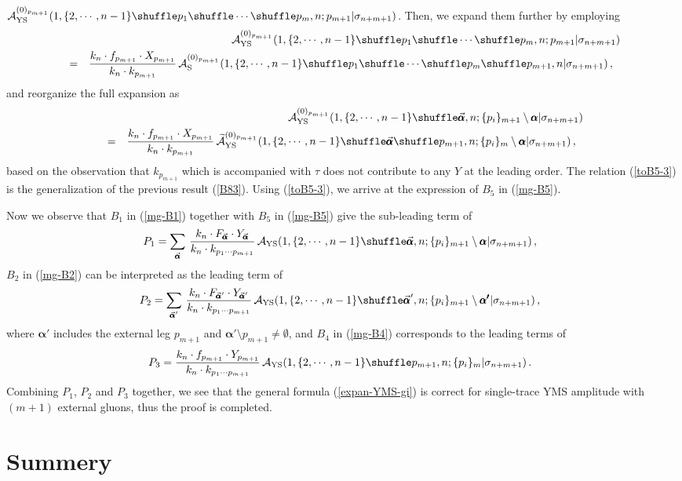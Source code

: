 \documentclass[preprint,showpacs,onecolumn,nofootinbib]{revtex4}
\newcommand{\bea}{\begin{eqnarray}}
\newcommand{\eea}{\end{eqnarray}}
\newcommand{\nn}{\nonumber \\}
\def\W #1{\widetilde{#1}}
\def\eref#1{(\ref{#1})}
\def\a{{\alpha}}
\begin{document}
${\cal A}^{(0)_{p_{m+1}}}_{\rm YS}(1,\{2,\cdots,n-1\}\shuffle p_1\shuffle\cdots\shuffle p_m,n;p_{m+1}|\sigma_{n+m+1})$. Then, we expand them further by employing
%
\bea
& &{\cal A}^{(0)_{p_{m+1}}}_{\rm YS}(1,\{2,\cdots,n-1\}\shuffle p_1\shuffle\cdots\shuffle p_m,n;p_{m+1}|\sigma_{n+m+1})\nn
&=&{k_n\cdot f_{p_{m+1}}\cdot X_{p_{m+1}}\over k_n\cdot k_{p_{m+1}}}\,{\cal A}^{(0)_{p_{m+1}}}_{\rm S}(1,\{2,\cdots,n-1\}\shuffle p_1\shuffle\cdots\shuffle p_m\shuffle p_{m+1},n|\sigma_{n+m+1})\,,~~\label{toB5-2}
\eea
%
and reorganize the full expansion as
%
\bea
& &{\cal A}^{(0)_{p_{m+1}}}_{\rm YS}(1,\{2,\cdots,n-1\}\shuffle\vec{\pmb{\a}},n;\{p_i\}_{m+1}\setminus\pmb{\a}|\sigma_{n+m+1})\nn
&=&{k_n\cdot f_{p_{m+1}}\cdot X_{p_{m+1}}\over k_n\cdot k_{p_{m+1}}}\,\W{\cal A}^{(0)_{p_{m+1}}}_{\rm YS}(1,\{2,\cdots,n-1\}\shuffle\vec{\pmb{\a}}\shuffle p_{m+1},n;\{p_i\}_m\setminus\pmb{\a}|\sigma_{n+m+1})\,,~~\label{toB5-3}
\eea
%
based on the observation that $k_{p_{m+1}}$ which is accompanied with $\tau$ does not contribute to any $Y$ at the leading order.
The relation \eref{toB5-3} is the generalization of the previous result \eref{B83}.
Using \eref{toB5-3}, we arrive at the expression of $B_5$ in \eref{mg-B5}.

Now we observe that $B_1$ in \eref{mg-B1} together with $B_5$ in \eref{mg-B5} give the sub-leading term of
%
\bea
P_1=\sum_{\vec{\pmb{\a}}}\,{k_n\cdot F_{\vec{\pmb{\a}}}\cdot Y_{\vec{\pmb{\a}}}\over k_n\cdot k_{p_1\cdots p_{m+1}}}\,
{\cal A}_{\rm YS}(1,\{2,\cdots,n-1\}\shuffle\vec{\pmb{\a}},n;\{p_i\}_{m+1}\setminus\pmb{\a}|\sigma_{n+m+1})\,,~~\label{mg-P1}
\eea
%
$B_2$ in \eref{mg-B2} can be interpreted as the leading term of
%
\bea
P_2=\sum_{\vec{\pmb{\a}}'}\,{k_n\cdot F_{\vec{\pmb{\a}}'}\cdot Y_{\vec{\pmb{\a}}'}\over k_n\cdot k_{p_1\cdots p_{m+1}}}\,
{\cal A}_{\rm YS}(1,\{2,\cdots,n-1\}\shuffle\vec{\pmb{\a}}',n;\{p_i\}_{m+1}\setminus\pmb{\a'}|\sigma_{n+m+1})\,,~~\label{mg-P2}
\eea
%
where $\pmb{\a}'$ includes the external leg $p_{m+1}$ and $\pmb{\a}'\setminus p_{m+1}\neq\emptyset$, and $B_4$ in \eref{mg-B4} corresponds to the leading terms of
%
\bea
P_3={k_n\cdot f_{p_{m+1}}\cdot Y_{p_{m+1}}\over k_n\cdot k_{p_1\cdots p_{m+1}}}\,{\cal A}_{\rm YS}(1,\{2,\cdots,n-1\}\shuffle p_{m+1},n;\{p_i\}_m|\sigma_{n+m+1})\,.~~\label{mg-P3}
\eea
%
Combining $P_1$, $P_2$ and $P_3$ together, we see that the general formula \eref{expan-YMS-gi} is correct for single-trace YMS amplitude with $(m+1)$
external gluons, thus the proof is completed.


\section{Summery}
\label{sec-conclusion}
\end{document}
